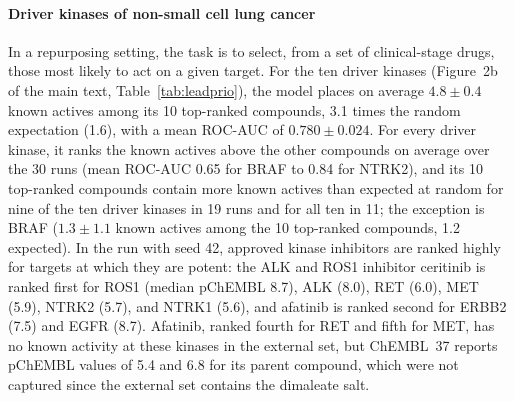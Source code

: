 \documentclass[11pt,letterpaper]{article}
\begin{document}
\paragraph{Driver kinases of non-small cell lung cancer}
In a repurposing setting, the task is to select, from a set of clinical-stage drugs, those most likely to act on a given target. For the ten driver kinases (Figure~2b of the main text, Table~\ref{tab:leadprio}), the model places on average $4.8\pm0.4$ known actives among its 10 top-ranked compounds, 3.1 times the random expectation (1.6), with a mean ROC-AUC of $0.780\pm0.024$. For every driver kinase, it ranks the known actives above the other compounds on average over the 30 runs (mean ROC-AUC 0.65 for BRAF to 0.84 for NTRK2), and its 10 top-ranked compounds contain more known actives than expected at random for nine of the ten driver kinases in 19 runs and for all ten in 11; the exception is BRAF ($1.3\pm1.1$ known actives among the 10 top-ranked compounds, 1.2 expected). In the run with seed 42, approved kinase inhibitors are ranked highly for targets at which they are potent: the ALK and ROS1 inhibitor ceritinib is ranked first for ROS1 (median pChEMBL 8.7), ALK (8.0), RET (6.0), MET (5.9), NTRK2 (5.7), and NTRK1 (5.6), and afatinib is ranked second for ERBB2 (7.5) and EGFR (8.7). Afatinib, ranked fourth for RET and fifth for MET, has no known activity at these kinases in the external set, but ChEMBL~37 reports pChEMBL values of 5.4 and 6.8 for its parent compound, which were not captured since the external set contains the dimaleate salt.
\end{document}
